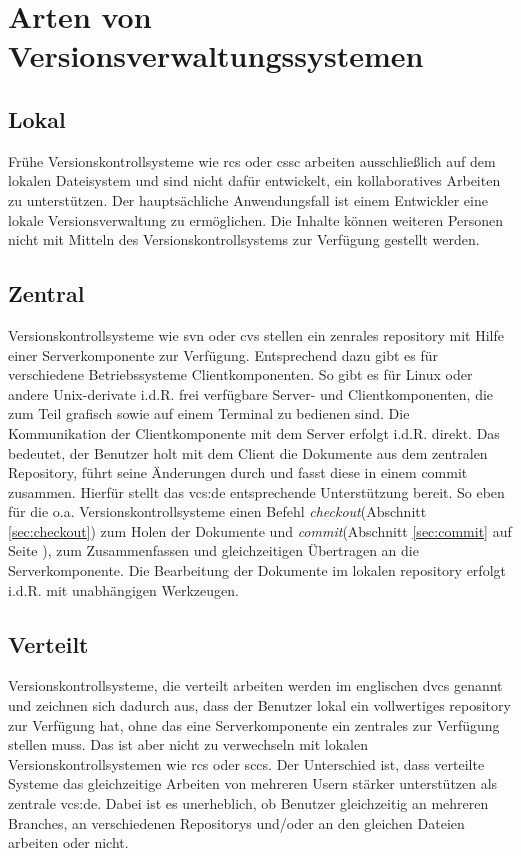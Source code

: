 \section{Arten von Versionsverwaltungssystemen}
\subsection{Lokal}\label{sec:local}
Frühe Versionskontrollsysteme wie \acrshort{rcs} oder \acrshort{cssc} arbeiten
ausschließlich auf dem lokalen Dateisystem und sind nicht dafür entwickelt, ein
kollaboratives Arbeiten zu unterstützen. Der hauptsächliche Anwendungsfall ist
einem Entwickler eine lokale Versionsverwaltung zu ermöglichen. Die Inhalte
können weiteren Personen nicht mit Mitteln des Versionskontrollsystems zur
Verfügung gestellt werden.

\subsection{Zentral}\label{sec:central}
Versionskontrollsysteme wie \acrshort{svn} oder \acrshort{cvs} stellen ein
zenrales \gls{repository} mit Hilfe einer Serverkomponente zur Verfügung.
Entsprechend dazu gibt es für verschiedene Betriebssysteme Clientkomponenten.
So gibt es für Linux oder andere Unix-derivate i.d.R. frei verfügbare Server-
und Clientkomponenten, die zum Teil grafisch sowie auf einem Terminal zu
bedienen sind. Die Kommunikation der Clientkomponente mit dem Server erfolgt
i.d.R. direkt. Das bedeutet, der Benutzer holt mit dem Client die Dokumente aus
dem zentralen Repository, führt seine Änderungen durch und fasst diese in einem
\gls{commit} zusammen. Hierfür stellt das \acrlong{vcs:de} entsprechende
Unterstützung bereit. So eben für die o.a. Versionskontrollsysteme einen Befehl
\textit{checkout}(Abschnitt \ref{sec:checkout})
zum Holen der Dokumente und \textit{commit}(Abschnitt \ref{sec:commit} auf
Seite \pageref{sec:commit}), zum Zusammenfassen und gleichzeitigen Übertragen
an die Serverkomponente. Die Bearbeitung der Dokumente im lokalen
\gls{repository} erfolgt i.d.R. mit unabhängigen
Werkzeugen.\cite[S.~38-40]{hagen:1678}

\subsection{Verteilt}\label{sec:decentral}
Versionskontrollsysteme, die verteilt arbeiten werden im englischen
\acrfull{dvcs} genannt und zeichnen sich dadurch aus, dass der Benutzer lokal
ein vollwertiges \gls{repository} zur Verfügung hat, ohne das eine
Serverkomponente ein zentrales zur Verfügung stellen muss. Das ist aber nicht
zu verwechseln mit lokalen Versionskontrollsystemen wie \acrshort{rcs} oder
\acrshort{sccs}. Der Unterschied ist, dass verteilte Systeme das gleichzeitige
Arbeiten von mehreren Usern stärker unterstützen als zentrale
\acrshort{vcs:de}. Dabei ist es unerheblich, ob Benutzer gleichzeitig an
mehreren Branches, an verschiedenen Repositorys und/oder an den gleichen
Dateien arbeiten oder nicht.\cite[S.~393-394]{cd}

